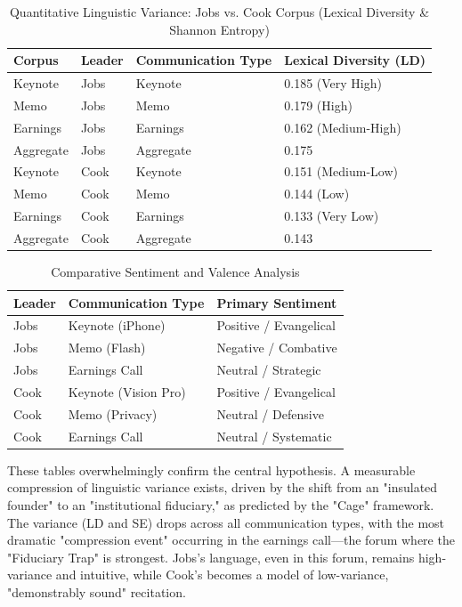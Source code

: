 \documentclass[12pt]{article}
\begin{document}
\begin{table}[htbp]
\caption{Quantitative Linguistic Variance: Jobs vs. Cook Corpus (Lexical Diversity \& Shannon Entropy)}
\begin{center}
\begin{tabular}{llll}
\toprule
Corpus & Leader & Communication Type & Lexical Diversity (LD) \\
\midrule
Keynote & Jobs & Keynote & 0.185 (Very High) \\
Memo & Jobs & Memo & 0.179 (High) \\
Earnings & Jobs & Earnings & 0.162 (Medium-High) \\
Aggregate & Jobs & Aggregate & 0.175 \\
Keynote & Cook & Keynote & 0.151 (Medium-Low) \\
Memo & Cook & Memo & 0.144 (Low) \\
Earnings & Cook & Earnings & 0.133 (Very Low) \\
Aggregate & Cook & Aggregate & 0.143 \\
\bottomrule
\end{tabular}
\end{center}
\end{table}

\begin{table}[htbp]
\caption{Comparative Sentiment and Valence Analysis}
\begin{center}
\begin{tabular}{lll}
\toprule
Leader & Communication Type & Primary Sentiment \\
\midrule
Jobs & Keynote (iPhone) & Positive / Evangelical \\
Jobs & Memo (Flash) & Negative / Combative \\
Jobs & Earnings Call & Neutral / Strategic \\
Cook & Keynote (Vision Pro) & Positive / Evangelical \\
Cook & Memo (Privacy) & Neutral / Defensive \\
Cook & Earnings Call & Neutral / Systematic \\
\bottomrule
\end{tabular}
\end{center}
\end{table}

These tables overwhelmingly confirm the central hypothesis. A measurable compression of linguistic variance exists, driven by the shift from an "insulated founder" to an "institutional fiduciary," as predicted by the "Cage" framework. The variance (LD and SE) drops across all communication types, with the most dramatic "compression event" occurring in the earnings call—the forum where the "Fiduciary Trap" is strongest. Jobs's language, even in this forum, remains high-variance and intuitive, while Cook's becomes a model of low-variance, "demonstrably sound" recitation.
\end{document}
